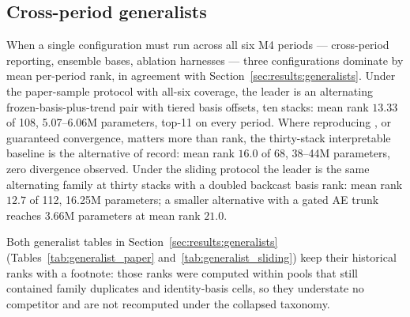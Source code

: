 \subsection{Cross-period generalists}
\label{app:hyperparams:generalists}

When a single configuration must run across all six M4 periods --- cross-period
reporting, ensemble bases, ablation harnesses --- three configurations
dominate by mean per-period rank, in agreement with
Section~\ref{sec:results:generalists}. Under the paper-sample protocol with
all-six coverage, the leader is an alternating frozen-basis-plus-trend pair
with tiered basis offsets, ten stacks: mean rank $13.33$ of 108,
5.07--6.06M parameters, top-11 on every period. Where reproducing
\citet{oreshkin2020nbeats}, or guaranteed convergence, matters more than
rank, the thirty-stack interpretable baseline is the alternative of record:
mean rank $16.0$ of 68, 38--44M parameters, zero divergence observed. Under
the sliding protocol the leader is the same alternating family at thirty
stacks with a doubled backcast basis rank: mean rank $12.7$ of 112,
16.25M parameters; a smaller alternative with a gated AE trunk reaches
3.66M parameters at mean rank $21.0$.

Both generalist tables in Section~\ref{sec:results:generalists}
(Tables~\ref{tab:generalist_paper} and~\ref{tab:generalist_sliding}) keep
their historical ranks with a footnote: those ranks were computed within
pools that still contained family duplicates and identity-basis cells, so
they understate no competitor and are not recomputed under the collapsed
taxonomy.


